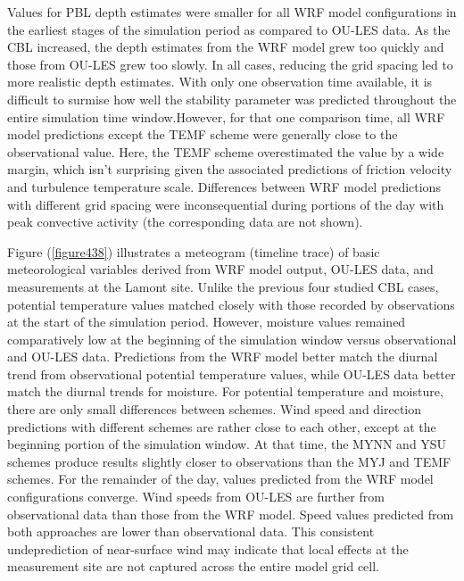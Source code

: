 Values for PBL depth estimates were smaller for all WRF model configurations in the earliest stages of the simulation period as compared to OU-LES data. As the CBL increased, the depth estimates from the WRF model grew too quickly and those from OU-LES grew too slowly. In all cases, reducing the grid spacing led to more realistic depth estimates. With only one observation time available, it is difficult to surmise how well the stability parameter was predicted throughout the entire simulation time window.However, for that one comparison time, all WRF model predictions except the TEMF scheme were generally close to the observational value. Here, the TEMF scheme overestimated the value by a wide margin, which isn't surprising given the associated predictions of friction velocity and turbulence temperature scale. Differences between WRF model predictions with different grid spacing were inconsequential during portions of the day with peak convective activity (the corresponding data are not shown). 

Figure (\autoref{figure438}) illustrates a meteogram (timeline trace) of basic meteorological variables derived from WRF model output, OU-LES data, and measurements at the Lamont site. Unlike the previous four studied CBL cases, potential temperature values matched closely with those recorded by observations at the start of the simulation period. However, moisture values remained comparatively low at the beginning of the simulation window versus observational and OU-LES data. Predictions from the WRF model better match the diurnal trend from observational potential temperature values, while OU-LES data better match the diurnal trends for moisture. For potential temperature and moisture, there are only small differences between schemes. Wind speed and direction predictions with different schemes are rather close to each other, except at the beginning portion of the simulation window. At that time, the MYNN and YSU schemes produce results slightly closer to observations than the MYJ and TEMF schemes. For the remainder of the day, values predicted from the WRF model configurations converge. Wind speeds from OU-LES are further from observational data than those from the WRF model. Speed values predicted from both approaches are lower than observational data. This consistent undeprediction of near-surface wind may indicate that local effects at the measurement site are not captured across the entire model grid cell.


